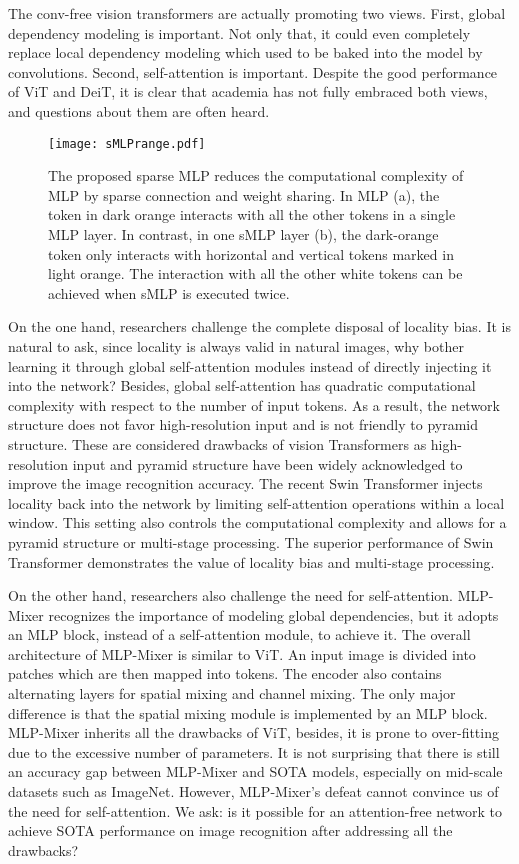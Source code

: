 \documentclass[letterpaper]{article} \usepackage{aaai22}  \usepackage{times}  \usepackage{helvet}  \usepackage{courier}  \usepackage[hyphens]{url}  \usepackage{graphicx} \usepackage{color}
\begin{document}
The conv-free vision transformers are actually promoting two views. First, global dependency modeling is important. Not only that, it could even completely replace local dependency modeling which used to be baked into the model by convolutions. Second, self-attention is important. Despite the good performance of ViT and DeiT, it is clear that academia has not fully embraced both views, and questions about them are often heard. 


\begin{figure}[t]
\centering
\texttt{[image: sMLPrange.pdf]} \caption{The proposed sparse MLP reduces the computational complexity of MLP by sparse connection and weight sharing. In MLP (a), the token in dark orange interacts with all the other tokens in a single MLP layer. In contrast, in one sMLP layer (b), the dark-orange token only interacts with horizontal and vertical tokens marked in light orange. The interaction with all the other white tokens can be achieved when sMLP is executed twice.}
\label{fig:sMLPinteraction}
\end{figure}


On the one hand, researchers challenge the complete disposal of locality bias. It is natural to ask, since locality is always valid in natural images, why bother learning it through global self-attention modules instead of directly injecting it into the network? Besides, global self-attention has quadratic computational complexity with respect to the number of input tokens. As a result, the network structure does not favor high-resolution input and is not friendly to pyramid structure. These are considered drawbacks of vision Transformers as high-resolution input and pyramid structure have been widely acknowledged to improve the image recognition accuracy. The recent Swin Transformer \cite{liu2021swin} injects locality back into the network by limiting self-attention operations within a local window. This setting also controls the computational complexity and allows for a pyramid structure or multi-stage processing. The superior performance of Swin Transformer demonstrates the value of locality bias and multi-stage processing. 

On the other hand, researchers also challenge the need for self-attention. MLP-Mixer \cite{tolstikhin2021mlp} recognizes the importance of modeling global dependencies, but it adopts an MLP block, instead of a self-attention module, to achieve it. The overall architecture of MLP-Mixer is similar to ViT. An input image is divided into patches which are then mapped into tokens. The encoder also contains alternating layers for spatial mixing and channel mixing. The only major difference is that the spatial mixing module is implemented by an MLP block. MLP-Mixer inherits all the drawbacks of ViT, besides, it is prone to over-fitting due to the excessive number of parameters. It is not surprising that there is still an accuracy gap between MLP-Mixer and SOTA models, especially on mid-scale datasets such as ImageNet. However, MLP-Mixer's defeat cannot convince us of the need for self-attention. 
We ask: is it possible for an attention-free network to achieve SOTA performance on image recognition after addressing all the drawbacks?
\end{document}
